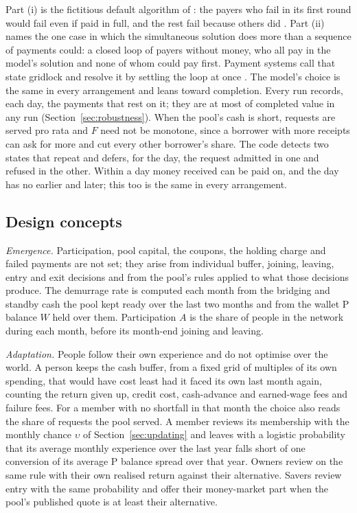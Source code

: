 Part (i) is the fictitious default algorithm of \cite{eisenbergnoe}: the payers who fail in its first round would
fail even if paid in full, and the rest fail because others did \cite{elsinger}. Part (ii) names the one case in
which the simultaneous solution does more than a sequence of payments could: a closed loop of payers without
money, who all pay in the model's solution and none of whom could pay first. Payment systems call that state
gridlock and resolve it by settling the loop at once \cite{bech}. The model's choice is the same in every
arrangement and leans toward completion. Every run records, each day, the payments that rest on it; they are
at most \NettingShareMost{} of completed value in any run (Section~\ref{sec:robustness}). When the pool's cash is short,
requests are served pro rata and $F$ need not be monotone, since a borrower with more receipts can ask for more and
cut every other borrower's share. The code detects two states that repeat and defers, for the day, the request
admitted in one and refused in the other. Within a day money received can be paid on, and the day has no
earlier and later; this too is the same in every arrangement.

\subsection{Design concepts}

\emph{Emergence.} Participation, pool capital, the coupons, the holding charge and failed payments are not set; they
arise from individual buffer, joining, leaving, entry and exit decisions and from the pool's rules applied to what
those decisions produce. The demurrage rate is computed each month from the bridging and standby cash the
pool kept ready over the last two months and from the wallet P balance $W$ held over them. Participation $A$ is
the share of people in the network during each month, before its month-end joining and leaving.

\emph{Adaptation.} People follow their own experience and do not optimise over the world. A person keeps the cash
buffer, from a fixed grid of multiples of its own spending, that would have cost least had it faced its own last
month again, counting the return given up, credit cost, cash-advance and earned-wage fees and failure fees. For a
member with no shortfall in that month the choice also reads the share of requests the pool served. A
member reviews its membership with the monthly chance $\upsilon$ of Section~\ref{sec:updating} and leaves with a logistic
probability that its average monthly experience over the last year falls short of one conversion of its average P
balance spread over that year. Owners review on the same rule with their own realised return against their
alternative. Savers review entry with the same probability and offer their money-market part when the pool's
published quote is at least their alternative.

